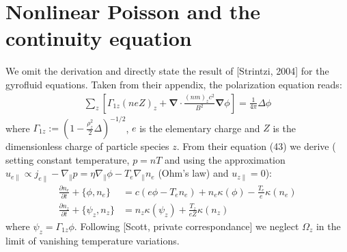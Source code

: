\documentclass[a4paper,12pt]{scrartcl}
\renewcommand{\vec}[1]{{\mathbf{#1}}}
\begin{document}
\section{Nonlinear Poisson and the continuity equation}
We omit the derivation and directly state the result of [Strintzi, 2004] for 
the gyrofluid equations. Taken
from their appendix, the polarization equation reads:%
\begin{align}
    \sum_z\left[ \Gamma_{1z} (neZ)_z + 
    \vec \nabla \cdot \frac{(nm)_zc^2}{B^2}\vec\nabla \phi\right] = \frac{1}{4\pi}\Delta \phi
    \label{eq:poisson}
\end{align}
where $\Gamma_{1z} := \left( 1-\frac{\rho_z^2}{2}\Delta \right)^{-1/2}$,
$e$ is the elementary charge and $Z$ is the dimensionless charge of particle
species $z$.
From their equation (43)  we derive ( setting constant temperature, $p = nT$ 
and using the approximation  
$u_{e\parallel} \propto j_{e\parallel} - \nabla_\parallel p 
        = \eta \nabla_\parallel\phi - T_e\nabla_\parallel n_e$
(Ohm's law)
and $u_{z\parallel} =0$):
\begin{subequations}
\begin{align}
    \frac{\partial n_e}{\partial t} + \{\phi, n_e\} &= c(e \phi - T_e n_e) + n_e\kappa(\phi) -
    \frac{T_e}{e}\kappa(n_e)  \\
    \frac{\partial n_z}{\partial t} + \{\psi_z, n_z\} &= n_z\kappa(\psi_z) +
    \frac{T_z}{eZ}\kappa(n_z) 
    \label{}
\end{align}
\end{subequations}
where $\psi_z = \Gamma_{1z} \phi$. Following [Scott, private correspondance] we 
 neglect $\Omega_z$ in the limit of vanishing temperature variations.
\end{document}

